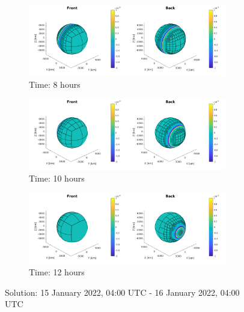 \documentclass[twoside]{bsu-ms}
\begin{document}
\medskip

\begin{figure}[!htbp]\ContinuedFloat
\vspace{-15pt}
\centering

\begin{subfigure}{\textwidth}
  \centering
  \includegraphics[width=0.95\textwidth,clip=True,trim=4cm 0cm 4cm 0cm]{images/ideal/ideal_16.png}
  \caption{Time: 8 hours }
\end{subfigure}

\medskip

\begin{subfigure}{\textwidth}
  \centering
  \includegraphics[width=0.95\textwidth,clip=True,trim=4cm 0cm 4cm 0cm]{images/ideal/ideal_20.png}
  \caption{Time: 10 hours }
\end{subfigure}

\medskip

\begin{subfigure}{\textwidth}
  \centering
  \includegraphics[width=0.95\textwidth,clip=True,trim=4cm 0cm 4cm 0cm]{images/ideal/ideal_24.png}
  \caption{Time: 12 hours }
\end{subfigure}

\caption{Solution: 15 January 2022, 04:00 $\mathrm{UTC}$ - 16 January 2022, 04:00 $\mathrm{UTC}$}
\end{figure}
\end{document}
